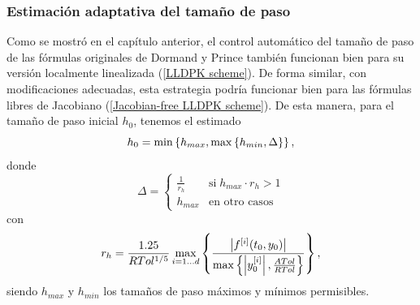 \subsubsection{Estimación adaptativa del tamaño de paso}\label{Sec:AdaptiveLLscheme}

Como se mostró en el capítulo anterior, el control automático del tamaño de paso de las fórmulas originales de Dormand y Prince también funcionan bien para su versión localmente linealizada (\ref{LLDPK scheme}). De forma similar, con modificaciones adecuadas, esta estrategia podría funcionar bien para las fórmulas libres de Jacobiano (\ref{Jacobian-free LLDPK scheme}). De esta manera, para el tamaño de paso inicial $h_0$, tenemos el estimado
\begin{equation}
    h_0 = \min\left\{  h_{max}, \max\left\{  h_{min} ,\Delta \right\}  \right\}, \label{hcero-fj}
\end{equation}
donde
\begin{equation*}
    \Delta = \begin{cases}
        \frac{1}{r_h} & \text{si} \; h_{max}\cdot r_h>1\\
        h_{max} & \text{en otro casos}
        \end{cases}
\end{equation*}
con
\begin{equation*}
     r_h = \frac{1\mathord{.}25}{RTol^{1/5}}\max_{i=1\ldots d}\left\{\frac{ \left\lvert f^{[i]}(t_0,y_0) \right\rvert }
    {\max\left\{ \left\lvert y^{[i]}_0 \right\rvert ,\frac{ATol}{RTol} \right\}}\right\},
\end{equation*}
siendo $h_{max}$ y $h_{min}$ los tamaños de paso máximos y mínimos permisibles.

